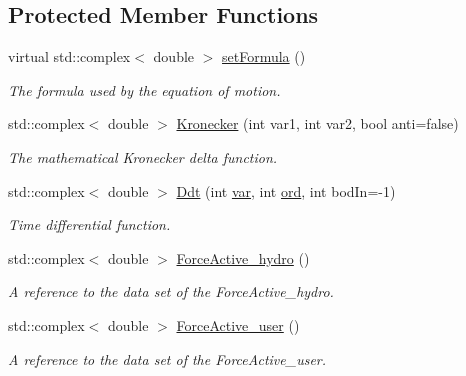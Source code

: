 \subsection*{Protected Member Functions}
\begin{DoxyCompactItemize}
\item 
virtual std\-::complex$<$ double $>$ \hyperlink{classosea_1_1ofreq_1_1_equationof_motion_a1d8614b11de9396f3795e4b560e6c368}{set\-Formula} ()
\begin{DoxyCompactList}\small\item\em The formula used by the equation of motion. \end{DoxyCompactList}\item 
std\-::complex$<$ double $>$ \hyperlink{classosea_1_1ofreq_1_1_equationof_motion_ad4ba6707460a9db7f8103157af0cae65}{Kronecker} (int var1, int var2, bool anti=false)
\begin{DoxyCompactList}\small\item\em The mathematical Kronecker delta function. \end{DoxyCompactList}\item 
std\-::complex$<$ double $>$ \hyperlink{classosea_1_1ofreq_1_1_equationof_motion_af12570e012041ea91d81820735b14c74}{Ddt} (int \hyperlink{classosea_1_1ofreq_1_1_equationof_motion_ab69511cc5037376cf7da80ce30d9eaab}{var}, int \hyperlink{classosea_1_1ofreq_1_1_equationof_motion_a31f904818ce75c9e2a2b5cff9fc707a5}{ord}, int bod\-In=-\/1)
\begin{DoxyCompactList}\small\item\em Time differential function. \end{DoxyCompactList}\item 
std\-::complex$<$ double $>$ \hyperlink{classosea_1_1ofreq_1_1_equationof_motion_a61f33c3fd47ae2b66db1982b9c973ec1}{Force\-Active\-\_\-hydro} ()
\begin{DoxyCompactList}\small\item\em A reference to the data set of the Force\-Active\-\_\-hydro. \end{DoxyCompactList}\item 
std\-::complex$<$ double $>$ \hyperlink{classosea_1_1ofreq_1_1_equationof_motion_a238df115825cbe08522bdc10b84880b9}{Force\-Active\-\_\-user} ()
\begin{DoxyCompactList}\small\item\em A reference to the data set of the Force\-Active\-\_\-user. \end{DoxyCompactList}\item 

\end{DoxyCompactItemize}

